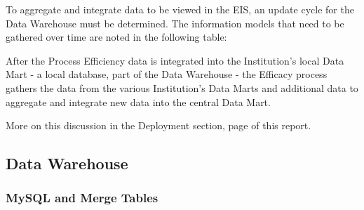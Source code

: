 To aggregate and integrate data to be viewed in the EIS, an update cycle for the
Data Warehouse must be determined. The information models that need to be
gathered over time are noted in the following table:  


After the Process Efficiency data is integrated into the Institution’s local
Data Mart - a local database, part of the Data Warehouse - the Efficacy process
gathers the data from the various Institution’s Data Marts and additional data
to aggregate and integrate new data into the central Data Mart.

More on this discussion in the Deployment section, page
\pageref{sec:deployment} of this report.

\subsection{Data Warehouse}

\subsubsection{MySQL and Merge Tables}


